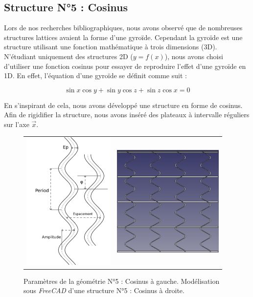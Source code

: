 \documentclass[a4paper]{article}
\begin{document}
	\subsection{Structure N°5 : Cosinus}
	\hspace{0.5cm}Lors de nos recherches bibliographiques, nous avons observé que de nombreuses structures lattices avaient la forme d’une gyroïde. Cependant la gyroïde est une structure utilisant une fonction mathématique à trois dimensions (3D). N’étudiant uniquement des structures 2D ($y=f(x)$), nous avons choisi d’utiliser une fonction cosinus pour essayer de reproduire l’effet d’une gyroïde en 1D. En effet, l'équation d'une gyroïde se définit comme suit :
	
	$$\sin x\cos y+\sin y\cos z+\sin z\cos x=0$$
	
	En s’inspirant de cela, nous avons développé une structure en forme de cosinus. Afin de rigidifier la structure, nous avons inséré des plateaux à intervalle réguliers sur l’axe $\vec{x}$.
	
	\begin{figure}[H]
		\centering
		\begin{tabular}{m{6cm}m{5.5cm}}
			\includegraphics[width=4.5cm]{Images/5/Cosinus.pdf} & \includegraphics[width=5.5cm]{Images/5/Freecad_cosinus.png}\\
		\end{tabular}
		\caption{Paramètres de la géométrie N°5 : Cosinus à gauche. Modélisation sous \textit{FreeCAD} d’une structure N°5 : Cosinus à droite.}
	\end{figure}	
	
\end{document}

